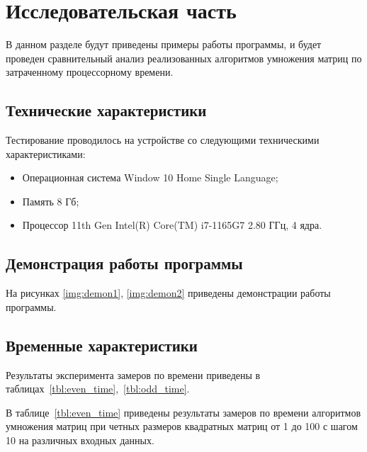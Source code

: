\chapter{Исследовательская часть}

В данном разделе будут приведены примеры работы программы, и будет проведен сравнительный анализ реализованных алгоритмов умножения матриц по затраченному процессорному времени.

\section{Технические характеристики}

Тестирование проводилось на устройстве со следующими техническими характеристиками:

\begin{itemize}
	\item Операционная система Window 10 Home Single Language;
	\item Память 8 Гб;
	\item Процессор 11th Gen Intel(R) Core(TM) i7-1165G7 2.80 ГГц, 4 ядра.
\end{itemize}

\section{Демонстрация работы программы}

На рисунках \ref{img:demon1}, \ref{img:demon2} приведены демонстрации работы программы.
\clearpage
{}
\clearpage
\section{Временные характеристики}

Результаты эксперимента замеров по времени приведены в таблицах~\ref{tbl:even_time},~\ref{tbl:odd_time}.

В таблице~\ref{tbl:even_time} приведены результаты замеров по времени алгоритмов умножения матриц при четных размеров квадратных матриц от 1 до 100 с шагом 10 на различных входных данных. 

